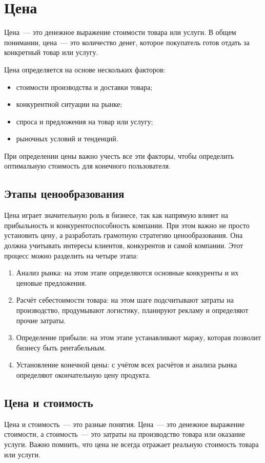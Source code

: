 \chapter{Цена}

Цена~--- это денежное выражение стоимости товара или услуги. 
В общем понимании, цена~--- это количество денег, которое покупатель готов отдать за конкретный товар или услугу.

Цена определяется на основе нескольких факторов:
\begin{itemize}
	\item стоимости производства и доставки товара;
	\item конкурентной ситуации на рынке;
	\item спроса и предложения на товар или услугу;
	\item рыночных условий и тенденций.
\end{itemize}

При определении цены важно учесть все эти факторы, чтобы определить оптимальную стоимость для конечного пользователя.

\section{Этапы ценообразования}
Цена играет значительную роль в бизнесе, так как напрямую влияет на прибыльность и конкурентоспособность компании. 
При этом важно не просто установить цену, а разработать грамотную стратегию ценообразования. 
Она должна учитывать интересы клиентов, конкурентов и самой компании. 
Этот процесс можно разделить на четыре этапа:
\begin{enumerate}
	\item Анализ рынка: на этом этапе определяются основные конкуренты и их ценовые предложения.
	\item Расчёт себестоимости товара: на этом шаге подсчитывают затраты на производство, продумывают логистику, планируют рекламу и определяют прочие затраты.
	\item Определение прибыли: на этом этапе устанавливают маржу, которая позволит бизнесу быть рентабельным.
	\item Установление конечной цены: с учётом всех расчётов и анализа рынка определяют окончательную цену продукта.
\end{enumerate}

\section{Цена и стоимость}
Цена и стоимость~--- это разные понятия. 
Цена~--- это денежное выражение стоимости, а стоимость~--- это затраты на производство товара или оказание услуги. 
Важно помнить, что цена не всегда отражает реальную стоимость товара или услуги.

